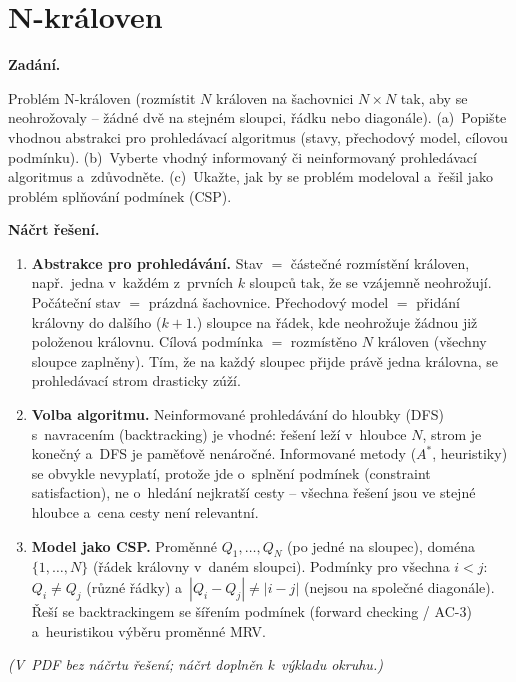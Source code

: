 \section{N-královen}

\noindent\textbf{Zadání.}\par
Problém N-královen (rozmístit $N$ královen na šachovnici $N\times N$ tak, aby se neohrožovaly -- žádné dvě na stejném sloupci, řádku nebo diagonále). (a)~Popište vhodnou abstrakci pro prohledávací algoritmus (stavy, přechodový model, cílovou podmínku). (b)~Vyberte vhodný informovaný či neinformovaný prohledávací algoritmus a~zdůvodněte. (c)~Ukažte, jak by se problém modeloval a~řešil jako problém splňování podmínek (CSP).

\medskip
\noindent\textbf{Náčrt řešení.}\par
\begin{enumerate}[nosep]
  \item[(a)] \textbf{Abstrakce pro prohledávání.} Stav $=$ částečné rozmístění královen, např.\ jedna v~každém z~prvních $k$ sloupců tak, že se vzájemně neohrožují. Počáteční stav $=$ prázdná šachovnice. Přechodový model $=$ přidání královny do dalšího ($k{+}1.$) sloupce na řádek, kde neohrožuje žádnou již položenou královnu. Cílová podmínka $=$ rozmístěno $N$ královen (všechny sloupce zaplněny). Tím, že na každý sloupec přijde právě jedna královna, se prohledávací strom drasticky zúží.
  \item[(b)] \textbf{Volba algoritmu.} Neinformované prohledávání do hloubky (DFS) s~navracením (backtracking) je vhodné: řešení leží v~hloubce $N$, strom je konečný a~DFS je paměťově nenáročné. Informované metody ($A^*$, heuristiky) se obvykle nevyplatí, protože jde o~splnění podmínek (constraint satisfaction), ne o~hledání nejkratší cesty -- všechna řešení jsou ve stejné hloubce a~cena cesty není relevantní.
  \item[(c)] \textbf{Model jako CSP.} Proměnné $Q_1,\dots,Q_N$ (po jedné na sloupec), doména $\{1,\dots,N\}$ (řádek královny v~daném sloupci). Podmínky pro všechna $i<j$: $Q_i\neq Q_j$ (různé řádky) a~$|Q_i-Q_j|\neq|i-j|$ (nejsou na společné diagonále). Řeší se backtrackingem se šířením podmínek (forward checking / AC-3) a~heuristikou výběru proměnné MRV.
\end{enumerate}

\medskip
\textit{(V~PDF bez náčrtu řešení; náčrt doplněn k~výkladu okruhu.)}
